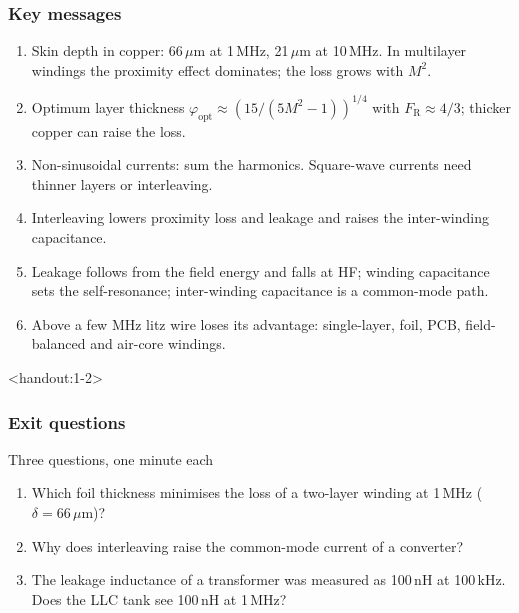 \begin{frame}
	\frametitle{Key messages}
	\begin{enumerate}
		\item Skin depth in copper: 66\,$\mu$m at 1\,MHz, 21\,$\mu$m at 10\,MHz. In multilayer windings the proximity effect dominates; the loss grows with $M^2$.
		\item Optimum layer thickness $\varphi_\mathrm{opt}\approx(15/(5M^2-1))^{1/4}$ with $F_\mathrm{R}\approx4/3$; thicker copper can raise the loss.
		\item Non-sinusoidal currents: sum the harmonics. Square-wave currents need thinner layers or interleaving.
		\item Interleaving lowers proximity loss and leakage and raises the inter-winding capacitance.
		\item Leakage follows from the field energy and falls at HF; winding capacitance sets the self-resonance; inter-winding capacitance is a common-mode path.
		\item Above a few MHz litz wire loses its advantage: single-layer, foil, PCB, field-balanced and air-core windings.
	\end{enumerate}
\end{frame}

\begin{frame}<handout:1-2>
	\frametitle{Exit questions}
	\begin{varblock}[\textwidth]{Three questions, one minute each}
		\begin{enumerate}
			\item Which foil thickness minimises the loss of a two-layer winding at 1\,MHz ($\delta=66\,\mu$m)?
			\item Why does interleaving raise the common-mode current of a converter?
			\item The leakage inductance of a transformer was measured as 100\,nH at 100\,kHz. Does the LLC tank see 100\,nH at 1\,MHz?
		\end{enumerate}
	\end{varblock}
\end{frame}

